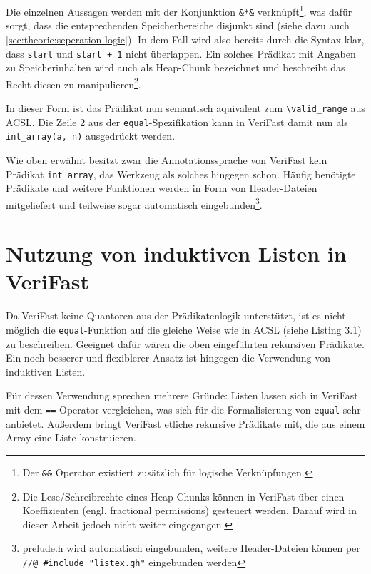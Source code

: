 Die einzelnen Aussagen werden mit der Konjunktion \lstinline{&*&} verknüpft\footnote{Der \lstinline{&&} Operator 
existiert zusätzlich für logische Verknüpfungen.}, was dafür sorgt, dass die entsprechenden
Speicherbereiche disjunkt sind (siehe dazu auch \ref{sec:theorie:seperation-logic}). In dem Fall wird also bereits
durch die Syntax klar, dass \lstinline{start} und \lstinline{start + 1} nicht überlappen. Ein solches Prädikat
mit Angaben zu Speicherinhalten wird auch als Heap-Chunk bezeichnet und beschreibt das Recht diesen zu
manipulieren\footnote{Die Lese/Schreibrechte eines Heap-Chunks können in VeriFast über einen Koeffizienten
(engl. fractional permissions) gesteuert werden. Darauf wird in dieser Arbeit jedoch nicht weiter eingegangen.}.

In dieser Form ist das Prädikat nun semantisch äquivalent zum \lstinline{\valid_range} aus ACSL. Die Zeile 2 aus
der \texttt{equal}-Spezifikation kann in VeriFast damit nun als \lstinline{int_array(a, n)} ausgedrückt werden.

Wie oben erwähnt besitzt zwar die Annotationssprache von VeriFast kein Prädikat \lstinline{int_array}, das Werkzeug
als solches hingegen schon. Häufig benötigte Prädikate und weitere Funktionen werden in Form von Header-Dateien
mitgeliefert und teilweise sogar automatisch eingebunden\footnote{prelude.h wird automatisch eingebunden, weitere 
Header-Dateien können per \\ \lstinline{//@ #include "listex.gh"} eingebunden werden}.


\section{Nutzung von induktiven Listen in VeriFast}
\label{sec:induktive-listen}

Da VeriFast keine Quantoren aus der Prädikatenlogik unterstützt, ist es nicht möglich die \texttt{equal}-Funktion
auf die gleiche Weise wie in ACSL (siehe Listing 3.1) zu beschreiben. Geeignet dafür wären die oben eingeführten
rekursiven Prädikate. Ein noch besserer und flexiblerer Ansatz ist hingegen die Verwendung von induktiven Listen.

Für dessen Verwendung sprechen mehrere Gründe: Listen lassen sich in VeriFast mit dem \lstinline{==} Operator vergleichen,
was sich für die Formalisierung von \texttt{equal} sehr anbietet. Außerdem bringt VeriFast etliche rekursive Prädikate
mit, die aus einem Array eine Liste konstruieren.



